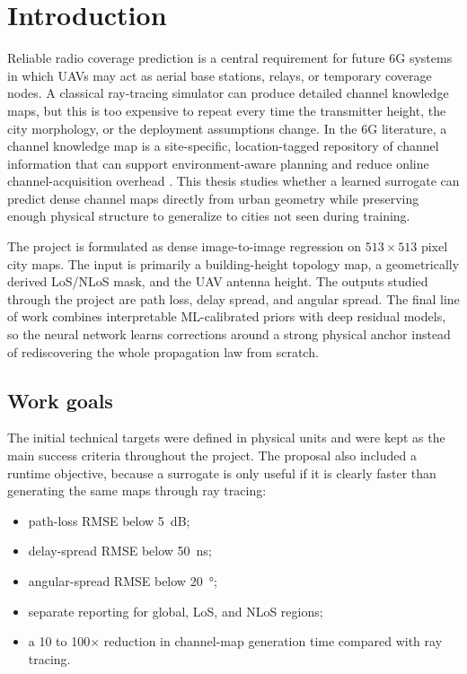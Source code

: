 \chapter{Introduction}

Reliable radio coverage prediction is a central requirement for future 6G
systems in which UAVs may act as aerial base stations, relays, or temporary
coverage nodes. A classical ray-tracing simulator can produce detailed channel
knowledge maps, but this is too expensive to repeat every time the transmitter
height, the city morphology, or the deployment assumptions change. In the 6G
literature, a channel knowledge map is a site-specific, location-tagged
repository of channel information that can support environment-aware planning
and reduce online channel-acquisition overhead
\cite{zengx2021ckm,ckmtutorial2024}. This thesis studies whether a learned
surrogate can predict dense channel maps directly from urban geometry while
preserving enough physical structure to generalize to cities not seen during
training.

The project is formulated as dense image-to-image regression on
$513\times513$ pixel city maps. The input is primarily a building-height
topology map, a geometrically derived LoS/NLoS mask, and the UAV antenna height. The outputs studied
through the project are path loss, delay spread, and angular spread. The final
line of work combines interpretable ML-calibrated priors with deep residual
models, so the neural network learns corrections around a strong physical
anchor instead of rediscovering the whole propagation law from scratch.

\section{Work goals}

The initial technical targets were defined in physical units and were kept as
the main success criteria throughout the project. The proposal also included a
runtime objective, because a surrogate is only useful if it is clearly faster
than generating the same maps through ray tracing:

\begin{itemize}
  \item path-loss RMSE below \SI{5}{dB};
  \item delay-spread RMSE below \SI{50}{ns};
  \item angular-spread RMSE below \SI{20}{\degree};
  \item separate reporting for global, LoS, and NLoS regions;
  \item a 10 to 100\(\times\) reduction in channel-map generation time compared
        with ray tracing.
\end{itemize}

